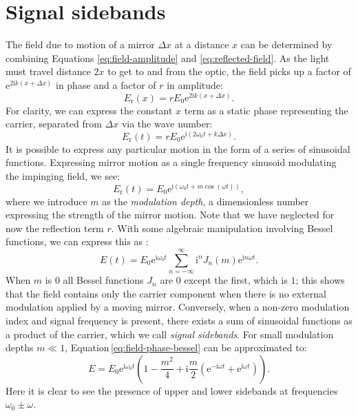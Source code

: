 \section{\label{sec:signal-sidebands}Signal sidebands}
The field due to motion of a mirror $\Delta x$ at a distance $x$ can be determined by combining Equations \ref{eq:field-amplitude} and \ref{eq:reflected-field}. As the light must travel distance $2x$ to get to and from the optic, the field picks up a factor of $\text{e}^{2\text{i}k \left( x + \Delta x \right)}$ in phase and a factor of $r$ in amplitude:
\begin{equation}
  E_{\text{r}} \left( x \right) = r E_0 \text{e}^{2\text{i} k \left( x + \Delta x \right)}.
\end{equation}
For clarity, we can express the constant $x$ term as a static phase representing the carrier, separated from $\Delta x$ via the wave number:
\begin{equation}
  \label{eq:field-amplitude-phase}
  E_{\text{r}} \left( t \right) = r E_0 \text{e}^{\text{i} \left( 2 \omega_0 t + k \Delta x\right)}.
\end{equation}
It is possible to express any particular motion in the form of a series of sinusoidal functions. Expressing mirror motion as a single frequency sinusoid modulating the impinging field, we see:
\begin{equation}
  \label{eq:field-phase-modulation}
  E_{\text{r}} \left( t \right) = E_0 \text{e}^{\text{i} \left(\omega_0 t + m \cos{\left( \omega t \right)} \right)},
\end{equation}
where we introduce $m$ as the \emph{modulation depth}, a dimensionless number expressing the strength of the mirror motion. Note that we have neglected for now the reflection term $r$. With some algebraic manipulation involving Bessel functions, we can express this as \cite{Freise2010}:
\begin{equation}
  \label{eq:field-phase-bessel}
  E \left( t \right) = E_0 \text{e}^{\text{i} \omega_0 t} \sum^{\infty}_{n=-\infty} \text{i}^n J_{n} \left( m \right) \text{e}^{\text{i} n \omega t}.
\end{equation}
When $m$ is $0$ all Bessel functions $J_{n}$ are $0$ except the first, which is $1$; this shows that the field contains only the carrier component when there is no external modulation applied by a moving mirror. Conversely, when a non-zero modulation index and signal frequency is present, there exists a sum of sinusoidal functions as a product of the carrier, which we call \emph{signal sidebands}. For small modulation depths $m \ll 1$, Equation\,\ref{eq:field-phase-bessel} can be approximated to:
\begin{equation}
  \label{eq:field-phase-mod-expanded}
  E = E_0 \text{e}^{\text{i} \omega_0 t} \left( 1 - \frac{m^2}{4} + \text{i} \frac{m}{2} \left( \text{e}^{-\text{i} \omega t} + \text{e}^{\text{i} \omega t} \right) \right).
\end{equation}
Here it is clear to see the presence of upper and lower sidebands at frequencies $\omega_0 \pm \omega$.

